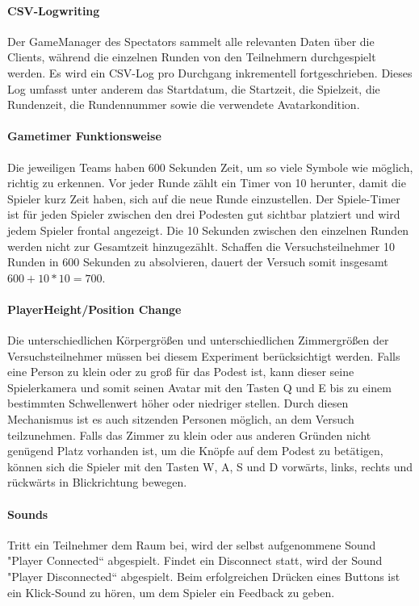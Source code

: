 \documentclass[a4paper,11pt]{article}%
\renewcommand{\\}{\vspace*{0.5\baselineskip} \newline}
\begin{document}
\paragraph{CSV-Logwriting}
Der GameManager des Spectators sammelt alle relevanten Daten über die Clients, während die einzelnen Runden von den Teilnehmern durchgespielt werden. Es wird ein CSV-Log pro Durchgang inkrementell fortgeschrieben. Dieses Log umfasst unter anderem das Startdatum, die Startzeit, die Spielzeit, die Rundenzeit, die Rundennummer sowie die verwendete Avatarkondition.

\paragraph{Gametimer Funktionsweise}
Die jeweiligen Teams haben 600 Sekunden Zeit, um so viele Symbole wie möglich, richtig zu erkennen. Vor jeder Runde zählt ein Timer von 10 herunter, damit die Spieler kurz Zeit haben, sich auf die neue Runde einzustellen. Der Spiele-Timer ist für jeden Spieler zwischen den drei Podesten gut sichtbar platziert und wird jedem Spieler frontal angezeigt. Die 10 Sekunden zwischen den einzelnen Runden werden nicht zur Gesamtzeit hinzugezählt. Schaffen die Versuchsteilnehmer 10 Runden in 600 Sekunden zu absolvieren, dauert der Versuch somit insgesamt \\
$600 + 10 * 10 = 700$.

\paragraph{PlayerHeight/Position Change}
Die unterschiedlichen Körpergrößen und unterschiedlichen Zimmergrößen der Versuchsteilnehmer müssen bei diesem Experiment berücksichtigt werden. Falls eine Person zu klein oder zu groß für das Podest ist, kann dieser seine Spielerkamera und somit seinen Avatar mit den Tasten Q und E bis zu einem bestimmten Schwellenwert höher oder niedriger stellen. Durch diesen Mechanismus ist es auch sitzenden Personen möglich, an dem Versuch teilzunehmen. Falls das Zimmer zu klein oder aus anderen Gründen nicht genügend Platz vorhanden ist, um die Knöpfe auf dem Podest zu betätigen, können sich die Spieler mit den Tasten W, A, S und D vorwärts, links, rechts und rückwärts in Blickrichtung bewegen.

\paragraph{Sounds}
Tritt ein Teilnehmer dem Raum bei, wird der selbst aufgenommene Sound "Player
Connected“ abgespielt. Findet ein Disconnect statt, wird der Sound "Player
Disconnected“ abgespielt. Beim erfolgreichen Drücken eines Buttons ist ein Klick-Sound zu hören, um dem Spieler ein Feedback zu geben. 
\end{document}
